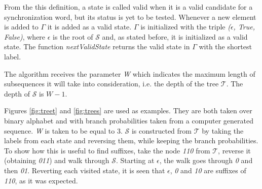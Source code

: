 {From the this definition, a state is called valid when it is a valid candidate for a synchronization word, but its status is yet to be tested. Whenever a new element is added to $\Gamma$ it is added as a valid state. $\Gamma$ is initialized with the triple \textit{($\epsilon$, True, False)}, where $\epsilon$ is the root of $\mathcal{S}$ and, as stated before, it is initialized as a valid state. The function \textit{nextValidState} returns the valid state in $\Gamma$ with the shortest label.

The algorithm receives the parameter \textit{W} which indicates the maximum length of subsequences it will take into consideration, i.e. the depth of the tree $\mathcal{T}$. The depth of $\mathcal{S}$ is $W - 1$.
  
Figures \ref{fig:treet} and \ref{fig:trees} are used as examples. They are both taken over binary alphabet and with branch probabilities taken from a computer generated sequence. \textit{W} is taken to be equal to 3. $\mathcal{S}$ is constructed from $\mathcal{T}$ by taking the labels from each state and reversing them, while keeping the branch probabilities. To show how this is useful to find suffixes, take the node \textit{110} from $\mathcal{T}$, reverse it (obtaining \textit{011}) and walk through $\mathcal{S}$. Starting at $\epsilon$, the walk goes through \textit{0} and then \textit{01}. Reverting each visited state, it is seen that $\epsilon$, \textit{0} and \textit{10} are suffixes of \textit{110}, as it was expected.
  
}
